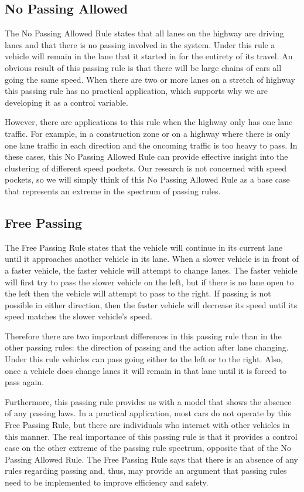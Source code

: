 \documentclass{amsart}
\begin{document}
	\subsection{No Passing Allowed}
	The No Passing Allowed Rule states that all lanes on the highway are driving lanes and that there is no passing involved in the system. Under this rule a vehicle will remain in the lane that it started in for the entirety of its travel. An obvious result of this passing rule is that there will be large chains of cars all going the same speed. When there are two or more lanes on a stretch of highway this passing rule has no practical application, which supports why we are developing it as a control variable. 
	
	However, there are applications to this rule when the highway only has one lane traffic. For example, in a construction zone or on a highway where there is only one lane traffic in each direction and the oncoming traffic is too heavy to pass. In these cases, this No Passing Allowed Rule can provide effective insight into the clustering of different speed pockets. Our research is not concerned with speed pockets, so we will simply think of this No Passing Allowed Rule as a base case that represents an extreme in the spectrum of passing rules. 
	\subsection{Free Passing}
	The Free Passing Rule states that the vehicle will continue in its current lane until it approaches another vehicle in its lane. When a slower vehicle is in front of a faster vehicle, the faster vehicle will attempt to change lanes. The faster vehicle will first try to pass the slower vehicle on the left, but if there is no lane open to the left then the vehicle will attempt to pass to the right. If passing is not possible in either direction, then the faster vehicle will decrease its speed until its speed matches the slower vehicle's speed.

	Therefore there are two important differences in this passing rule than in the other passing rules: the direction of passing and the action after lane changing. Under this rule vehicles can pass going either to the left or to the right. Also, once a vehicle does change lanes it will remain in that lane until it is forced to pass again. 

	Furthermore, this passing rule provides us with a model that shows the absence of any passing laws. In a practical application, most cars do not operate by this Free Passing Rule, but there are individuals who interact with other vehicles in this manner. The real importance of this passing rule is that it provides a control case on the other extreme of the passing rule spectrum, opposite that of the No Passing Allowed Rule. The Free Passing Rule says that there is an absence of any rules regarding passing and, thus, may provide an argument that passing rules need to be implemented to improve efficiency and safety. 
	
\end{document}
